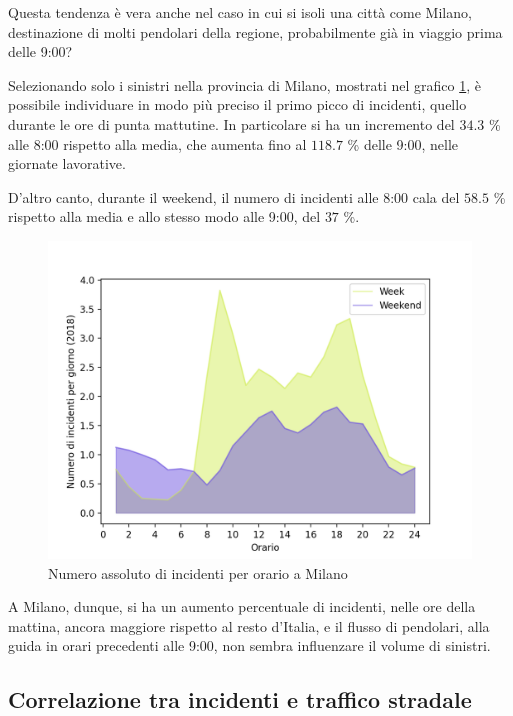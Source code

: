 \documentclass[a4paper]{report}
\begin{document}
Questa tendenza è vera anche nel caso in cui si isoli una città come Milano, 
destinazione di molti pendolari della regione, probabilmente 
già in viaggio prima delle 9:00?

Selezionando solo i sinistri nella provincia di Milano, mostrati nel grafico 
\ref{fig:week-weekend-milano}, è possibile individuare in modo più preciso
il primo picco di incidenti, quello durante le ore di punta mattutine. 
In particolare si ha un incremento del $34.3$ \% alle 8:00 rispetto alla media, 
che aumenta fino al $118.7$ \% delle 9:00, nelle giornate lavorative. 

D'altro canto, durante il weekend, il numero di incidenti alle 8:00 cala del $58.5$ \% rispetto 
alla media e allo stesso modo alle 9:00, del $37$ \%. 

\begin{figure}
    \includegraphics[width=\linewidth]{../src/incidenti/incidenti_senza_coords/ore_punta/week_weekend_milano.png}
    \caption{Numero assoluto di incidenti per orario a Milano}
    \label{fig:week-weekend-milano}
\end{figure}

A Milano, dunque, si ha un aumento percentuale di incidenti, nelle ore della mattina, 
ancora maggiore rispetto al resto d'Italia, e il flusso di pendolari, 
alla guida in orari precedenti alle 9:00, 
non sembra influenzare il volume di sinistri. 

\subsection{Correlazione tra incidenti e traffico stradale}
\end{document}
